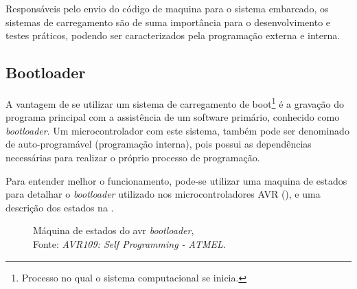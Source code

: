 Responsáveis pelo envio do código de maquina para o sistema embarcado, os sistemas de carregamento são de suma importância para o desenvolvimento e testes práticos, podendo ser caracterizados pela programação externa e interna.

\subsection{Bootloader}

A vantagem de se utilizar um sistema de carregamento de boot\footnote{Processo no qual o sistema computacional se inicia.} é
a gravação do programa principal com a assistência de um software primário, conhecido como \textit{bootloader}. Um microcontrolador
com este sistema, também pode ser denominado de auto-programável (programação interna), pois possui as dependências necessárias para realizar o próprio processo de programação.

Para entender melhor o funcionamento, pode-se utilizar uma maquina de estados para detalhar o \textit{bootloader} utilizado nos microcontroladores AVR (), e uma descrição dos estados na .

\begin{figure}[ht!]
  \centering
  \caption[Máquina de estados do avr \textit{bootloader}]{\label{fig:sm_bootloader}}{Máquina de estados
  do avr \textit{bootloader},\\Fonte: \textit{AVR109: Self Programming - ATMEL}.}
\end{figure}

